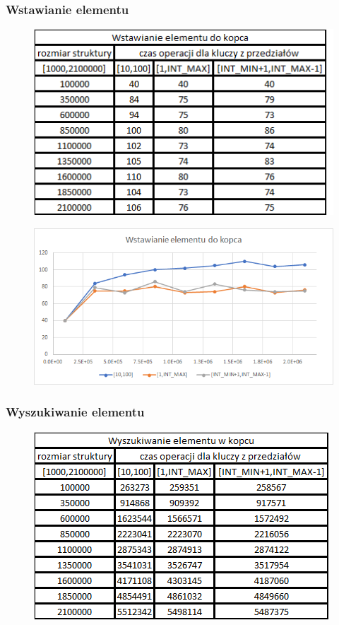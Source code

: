 \documentclass{article}
\begin{document}
\subsubsection*{Wstawianie elementu}
\begin{figure}[h!]

\includegraphics{images/wstawianie_kopiecpng.png}

\end{figure}

\begin{figure}[h!]
\includegraphics[width=11.3cm]{images/wstawianie_kopiec_w.png}
\end{figure}

\newpage

\subsubsection*{Wyszukiwanie elementu}
\begin{figure}[h!]

\includegraphics{images/wyszukiwanie_kopiec.png}

\end{figure}
\end{document}
